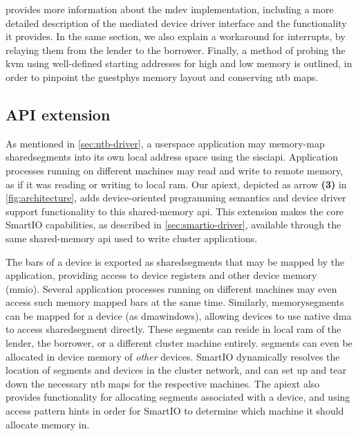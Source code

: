  provides more information about the \gls{mdev} implementation, including a more detailed description of the mediated device driver interface and the functionality it provides. 
%
In the same section, we also explain a workaround for interrupts, by relaying them from the \gls{lender} to the \gls{borrower}.
%
Finally, a method of probing the \gls{kvm} using well-defined starting addresses for high and low memory is outlined, in order to pinpoint the \gls{guestphys} memory layout and conserving \gls{ntb} maps.



\subsection{API extension}\label{sec:api}
As mentioned in \cref{sec:ntb-driver}, a \gls{userspace} application may memory-map \glspl{sharedsegment} into its own local address space using the \gls{sisciapi}.
%
Application processes running on different machines may read and write to remote memory, as if it was reading or writing to local \gls{ram}.
%
Our \gls{apiext}, depicted as arrow \textbf{(3)} in \cref{fig:architecture}, adds device-oriented programming semantics and device driver support functionality to this shared-memory \gls{api}.
%
This extension makes the core SmartIO capabilities, as described in \cref{sec:smartio-driver}, available through the same shared-memory \gls{api} used to write cluster applications.



The \glspl{bar} of a device is exported as \glspl{sharedsegment} that may be mapped by the application, providing access to device registers and other device memory (\gls{mmio}).
%
Several application processes running on different machines may even access such memory mapped \glspl{bar} at the same time.
%
Similarly, \glspl{memorysegment} can be mapped for a device (as \glspl{dmawindow}), allowing devices to use native \gls{dma} to access \gls{sharedsegment} directly.
%
These \glspl{segment} can reside in local \gls{ram} of the \gls{lender}, the \gls{borrower}, or a different cluster machine entirely.
%
\Glspl{segment} can even be allocated in device memory of \emph{other} devices.
%
SmartIO dynamically resolves the location of \glspl{segment} and devices in the cluster network, and can set up and tear down the necessary \gls{ntb} maps for the respective machines.
%
The \gls{apiext} also provides functionality for allocating \glspl{segment} associated with a device, and using access pattern hints in order for SmartIO to determine which machine it should allocate memory in.



